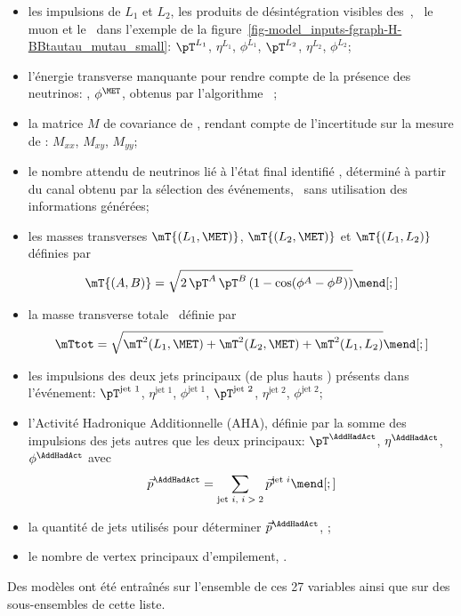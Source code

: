 \begin{itemize}
\item les impulsions de $L_1$ et $L_2$, les produits de désintégration visibles des~\tau,
\ie\ le muon et le \tauh\ dans l'exemple de la figure~\ref{fig-model_inputs-fgraph-H-BBtautau_mutau_small}:
$\pT^{L_1}$, $\eta^{L_1}$, $\phi^{L_1}$,
$\pT^{L_2}$, $\eta^{L_2}$, $\phi^{L_2}$;
\item l'énergie transverse manquante pour rendre compte de la présence des neutrinos:
\MET, $\phi^{\MET}$, obtenus par l'algorithme \PUPPI~\cite{PUPPI};
\item la matrice $M$ de covariance de \MET, rendant compte de l'incertitude sur la mesure de \MET:
$M_{xx}$, $M_{xy}$, $M_{yy}$;
\item le nombre attendu de neutrinos lié à l'état final identifié \Nnu,
déterminé à partir du canal obtenu par la sélection des événements, \ie\ sans utilisation des informations générées;
\item les masses transverses
$\mT {(L_1,\MET)}$,
$\mT {(L_2,\MET)}$ et
$\mT {(L_1,L_2)}$
définies par
\begin{equation}
\mT {(A,B)} = \sqrt{2 \, \pT^{A} \, \pT^{B} \, (1-\cos(\phi^A-\phi^B))}
\mend[;]
\end{equation}
\item la masse transverse totale \mTtot\ définie par
\begin{equation}
\mTtot = \sqrt{\mT^2 {(L_1,\MET)} + \mT^2 {(L_2,\MET)} + \mT^2 {(L_1,L_2)}}
\mend[;]
\end{equation}
\item les impulsions des deux jets principaux (de plus hauts \pT) présents dans l'événement:
$\pT^\text{jet 1}$, $\eta^\text{jet 1}$, $\phi^\text{jet 1}$,
$\pT^\text{jet 2}$, $\eta^\text{jet 2}$, $\phi^\text{jet 2}$;
\item l'Activité Hadronique Additionnelle (AHA), définie par la somme des impulsions des jets autres que les deux principaux:
$\pT^{\AddHadAct}$, $\eta^{\AddHadAct}$, $\phi^{\AddHadAct}$ avec
\begin{equation}
\vec{p}^{\AddHadAct} = \sum_\text{jet $i$, $i > 2$} \vec{p}^\text{jet $i$}
\mend[;]
\end{equation}
\item la quantité de jets utilisés pour déterminer $\vec{p}^{\AddHadAct}$, \Njetsr;
\item le nombre de vertex principaux d'empilement, \Npu.
\end{itemize}
Des modèles ont été entraînés sur l'ensemble de ces 27 variables ainsi que sur des sous-ensembles de cette liste.